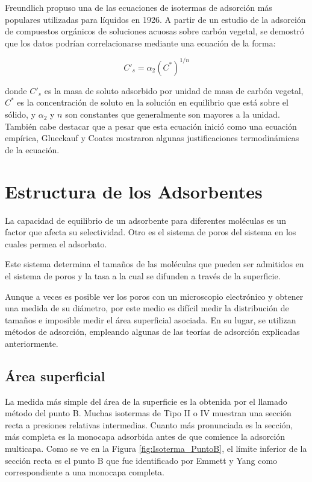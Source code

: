 \documentclass[11pt]{book}
\begin{document}
Freundlich propuso una de las ecuaciones de isotermas de adsorción más populares utilizadas para líquidos en 1926. A partir de un estudio de la adsorción de compuestos orgánicos de soluciones acuosas sobre carbón vegetal, se demostró que los datos podrían correlacionarse mediante una ecuación de la forma:

\begin{equation}
    \label{eq:IsotermaFreundlich}
    C'_s=\alpha_2 (C^*)^{1/n}
\end{equation}

donde $C'_s$ es la masa de soluto adsorbido por unidad de masa de carbón vegetal, $C^*$ es la concentración de soluto en la solución en equilibrio que está sobre el sólido, y $\alpha_2$ y $n$ son constantes que generalmente son mayores a la unidad. También cabe destacar que a pesar que esta ecuación inició como una ecuación empírica, Glueckauf y Coates mostraron algunas justificaciones termodinámicas de la ecuación.

\section{Estructura de los Adsorbentes}

La capacidad de equilibrio de un adsorbente para diferentes moléculas es un factor que afecta su selectividad. Otro es el sistema de poros del sistema en los cuales permea el adsorbato. 

Este sistema determina el tamaños de las moléculas que pueden ser admitidos en el sistema de poros y la tasa a la cual se difunden a través de la superficie.

Aunque a veces es posible ver los poros con un microscopio electrónico y obtener una medida de su diámetro, por este medio es difícil medir la distribución de tamaños e imposible medir el área superficial asociada. En su lugar, se utilizan métodos de adsorción, empleando algunas de las teorías de adsorción explicadas anteriormente.

\subsection{Área superficial}

La medida más simple del área de la superficie es la obtenida por el llamado método del punto B. Muchas isotermas de Tipo II o IV muestran una sección recta a presiones relativas intermedias. Cuanto más pronunciada es la sección, más completa es la monocapa adsorbida antes de que comience la adsorción multicapa. Como se ve en la Figura \ref{fig:Isoterma_PuntoB}, el límite inferior de la sección recta es el punto B que fue identificado por Emmett y Yang como correspondiente a una monocapa completa. 
\end{document}
